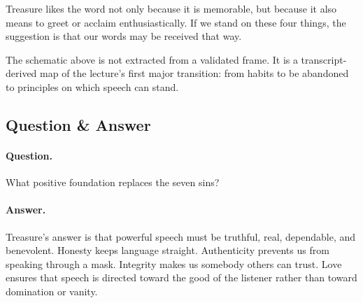 Treasure likes the word not only because it is memorable, but because it also means to greet or acclaim enthusiastically. If we stand on these four things, the suggestion is that our words may be received that way.

\begin{figure}[h]
\centering
{}
\end{figure}

The schematic above is not extracted from a validated frame. It is a transcript-derived map of the lecture's first major transition: from habits to be abandoned to principles on which speech can stand.

\subsection{Question \& Answer}

\paragraph{Question.} What positive foundation replaces the seven sins?

\paragraph{Answer.} Treasure's answer is that powerful speech must be truthful, real, dependable, and benevolent. Honesty keeps language straight. Authenticity prevents us from speaking through a mask. Integrity makes us somebody others can trust. Love ensures that speech is directed toward the good of the listener rather than toward domination or vanity.


